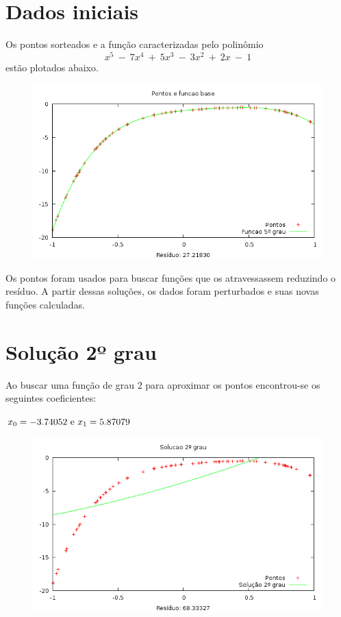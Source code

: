 \section{Dados iniciais}
Os pontos sorteados e a função caracterizadas pelo polinômio \[x^5~-~7x^4~+~5x^3~-~3x^2~+~2x~-~1\]
estão plotados abaixo.

\begin{figure}[h]
\centering
\includegraphics[scale=0.7]{funcbase}
\end{figure}

Os pontos foram usados para buscar funções que os atravessassem reduzindo o resíduo.
A partir dessas soluções, os dados foram perturbados e suas novas funções calculadas.



\newpage
\section{Solução 2º grau}

Ao buscar uma função de grau 2 para aproximar os pontos encontrou-se os seguintes 
coeficientes:

\(x_0 = -3.74052 ~$e$~  x_1 = 5.87079 \)

\begin{figure}[h]
\centering
\includegraphics[scale=0.7]{sol2grau}
\end{figure}

